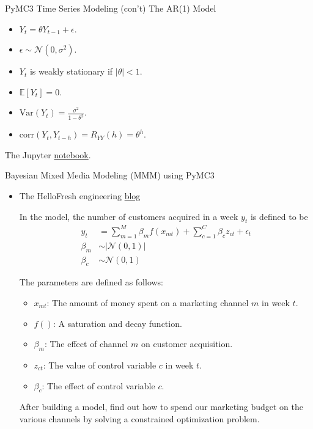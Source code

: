 \documentclass[20pt]{beamer}
\begin{document}
\begin{frame}{PyMC3 Time Series Modeling (con't)}
The AR(1) Model
\begin{itemize}
  \item $Y_t = \theta Y_{t-1} + \epsilon$.

  \item $\epsilon \sim \mathcal{N}(0, \sigma^2)$.

  \item $Y_t$ is weakly stationary if $|\theta| < 1$.

  \item $\mathbb{E}[Y_t] = 0$.

  \item $\text{Var}(Y_t) = \frac{\sigma^2}{1 - \theta^2}$.

  \item $\text{corr}(Y_t, Y_{t-h}) = R_{YY}(h) = \theta^h$.

\end{itemize}
The Jupyter \href{https://github.com/pymc-devs/pymc-examples/blob/main/examples/time_series/AR.ipynb}{notebook}.
\end{frame}

\begin{frame}{Bayesian Mixed Media Modeling (MMM) using PyMC3}
\begin{itemize}
  \item The HelloFresh engineering \href{https://engineering.hellofresh.com/bayesian-media-mix-modeling-using-pymc3-for-fun-and-profit-2bd4667504e6}{blog}

In the model, the number of customers acquired in a week $y_t$ is defined to be
\begin{align*}
  y_t & = \sum_{m=1}^{M} \beta_m f(x_{mt}) + \sum_{c=1}^{C} \beta_c z_{ct} + \epsilon_t \\
  \beta_m & \sim \lvert\mathcal{N}(0, 1){\rvert} \\
  \beta_c & \sim \mathcal{N}(0, 1)
\end{align*}

The parameters are defined as follows:
  \begin{itemize}
   \item $x_{mt}$: The amount of money spent on a marketing channel $m$ in week $t$.
   \item $f()$: A saturation and decay function.
   \item $\beta_m$: The effect of channel $m$ on customer acquisition.
   \item $z_{ct}$: The value of control variable $c$ in week $t$.
   \item $\beta_c$: The effect of control variable $c$.
  \end{itemize}

After building a model, find out how to spend our marketing budget on the various channels by solving a constrained optimization problem.
\end{itemize}
\end{frame}
\end{document}
